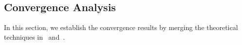\documentclass[11pt]{article}
\newcommand{\zwhcomm}[2]{{\sf\color{purple} #1}{\sf\color{blue} #2}}
\numberwithin{equation}{section}
\begin{document}





\subsection{Convergence Analysis}

In this section, we establish the convergence results by merging the theoretical techniques in~\cite{dembo_truncated-newton_1983} and~\cite{huang_riemannian_2018}.


\end{document}
